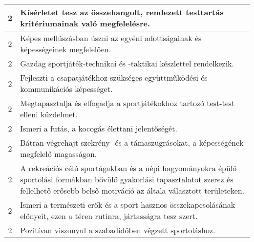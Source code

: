 \begin{longtable}{c | p{} }
                                
                                          2 &  Kísérletet tesz az összehangolt, rendezett testtartás kritériumainak való megfelelésre. \\ \hline
                                          2 &  Képes mellúszásban úszni az egyéni adottságainak és képességeinek megfelelően. \\ \hline
                                          2 &  Gazdag sportjáték-technikai és -taktikai készlettel rendelkezik. \\ \hline
                                          2 &  Fejleszti a csapatjátékhoz szükséges együttműködési és kommunikációs képességet. \\ \hline
                                          2 &  Megtapasztalja és elfogadja a sportjátékokhoz tartozó test-test elleni küzdelmet. \\ \hline
                                          2 &  Ismeri a futás, a kocogás élettani jelentőségét. \\ \hline
                                          2 &  Bátran végrehajt szekrény- és a támaszugrásokat, a képességének megfelelő magasságon. \\ \hline
                                          2 &  A rekreációs célú sportágakban és a népi hagyományokra épülő sportolási formákban bővülő gyakorlási tapasztalatot szerez és fellelhető erősebb belső motiváció az általa választott területeken. \\ \hline
                                          2 &  Ismeri a természeti erők és a sport hasznos összekapcsolásának előnyeit, ezen a téren rutinra, jártasságra tesz szert. \\ \hline
                                          2 &  Pozitívan viszonyul a szabadidőben végzett sportoláshoz. \\ \hline
                                      

\end{longtable}
